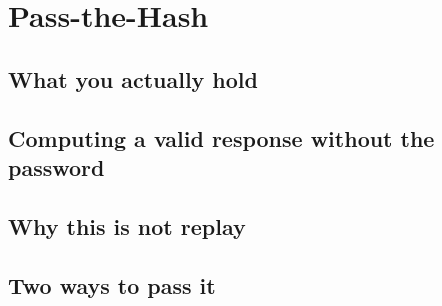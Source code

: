 \section{Pass-the-Hash}
\unwritten
\label{sec:pth}

\subsection{What you actually hold}
\unwritten

\subsection{Computing a valid response without the password}
\unwritten

\subsection{Why this is not replay}
\unwritten

\subsection{Two ways to pass it}
\unwritten

